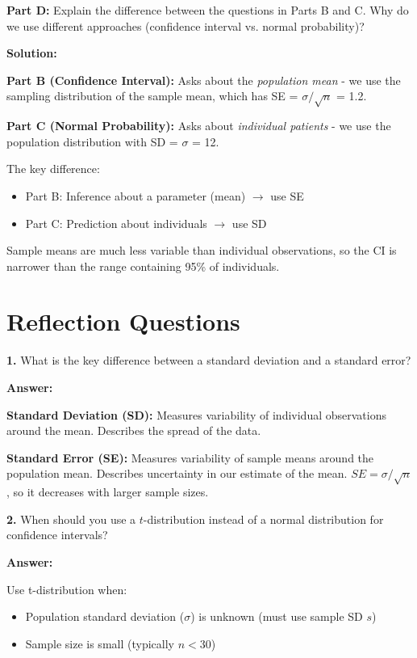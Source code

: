 \documentclass[11pt]{article}
\begin{document}
\textbf{Part D:} Explain the difference between the questions in Parts B and C. Why do we use different approaches (confidence interval vs. normal probability)?

\textcolor{correctgreen}{\textbf{Solution:}}

\textbf{Part B (Confidence Interval):} Asks about the \emph{population mean} - we use the sampling distribution of the sample mean, which has SE = $\sigma/\sqrt{n}$ = 1.2.

\textbf{Part C (Normal Probability):} Asks about \emph{individual patients} - we use the population distribution with SD = $\sigma$ = 12.

The key difference:
\begin{itemize}
\item Part B: Inference about a parameter (mean) $\rightarrow$ use SE
\item Part C: Prediction about individuals $\rightarrow$ use SD
\end{itemize}

Sample means are much less variable than individual observations, so the CI is narrower than the range containing 95\% of individuals.

\newpage

\section*{Reflection Questions}

\textbf{1.} What is the key difference between a standard deviation and a standard error?

\textcolor{correctgreen}{\textbf{Answer:}}

\textbf{Standard Deviation (SD):} Measures variability of individual observations around the mean. Describes the spread of the data.

\textbf{Standard Error (SE):} Measures variability of sample means around the population mean. Describes uncertainty in our estimate of the mean. $SE = \sigma/\sqrt{n}$, so it decreases with larger sample sizes.

\vspace{0.5cm}

\textbf{2.} When should you use a $t$-distribution instead of a normal distribution for confidence intervals?

\textcolor{correctgreen}{\textbf{Answer:}}

Use t-distribution when:
\begin{itemize}
\item Population standard deviation ($\sigma$) is unknown (must use sample SD $s$)
\item Sample size is small (typically $n < 30$)
\end{itemize}
\end{document}
